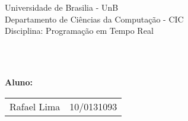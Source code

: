 \begin{flushleft}
Universidade de Brasilia - UnB\\
Departamento de Ciências da Computação - CIC\\
Disciplina: Programação em Tempo Real\\
\end{flushleft}

\vspace{0.3\textheight}
\begin{center}
    \Huge\textbf{\\\tituloRelatorio \\}
\end{center}

\vspace{0.3\textheight}
\begin{flushleft}
\textbf{Aluno:}\\
\vspace{2mm}
\begin{tabular}{ll}
    Rafael Lima & 10/0131093
\end{tabular}
\end{flushleft}


\newpage
\tableofcontents
\newpage

